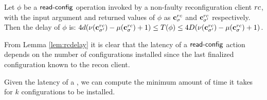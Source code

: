\begin{lemma}
	\label{lem:rcdelay}
	Let $\phi$ be a $\act{read-config}$ operation invoked by a non-faulty reconfiguration client $rc$, 
	with the input argument and returned values of $\phi$ as  $\mathbf{c}^{rc}_{\sigma}$ and  $\mathbf{c}^{rc}_{\sigma'}$ respectively. Then the delay of $\phi$ is:	$4d(\nu(\mathbf{c}^{rc}_{\sigma'})-\mu(\mathbf{c}^{rc}_{\sigma})+1)\leq T(\phi)\leq4D(\nu(\mathbf{c}^{rc}_{\sigma'})-\mu(\mathbf{c}^{rc}_{\sigma})+1)$.
\end{lemma}

From Lemma \ref{lem:rcdelay} it is clear that the latency of a $\act{read-config}$ action 
depends on the number of configurations installed since the last  finalized configuration known to the recon client.

Given the latency of a , we can compute the minimum amount 
of time it takes for $k$ configurations to be installed.


